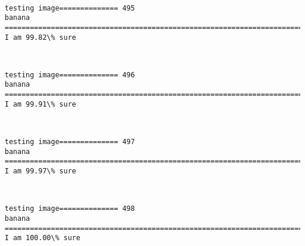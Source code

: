 \documentclass[11pt]{article}
\begin{document}
    \begin{center}
    \end{center}
    { \hspace*{\fill} \\}
    
    \begin{Verbatim}[commandchars=\\\{\}]
testing image============== 495
banana
============================================================================
I am 99.82\% sure

    \end{Verbatim}

    \begin{center}
    \end{center}
    { \hspace*{\fill} \\}
    
    \begin{Verbatim}[commandchars=\\\{\}]
testing image============== 496
banana
============================================================================
I am 99.91\% sure

    \end{Verbatim}

    \begin{center}
    \end{center}
    { \hspace*{\fill} \\}
    
    \begin{Verbatim}[commandchars=\\\{\}]
testing image============== 497
banana
============================================================================
I am 99.97\% sure

    \end{Verbatim}

    \begin{center}
    \end{center}
    { \hspace*{\fill} \\}
    
    \begin{Verbatim}[commandchars=\\\{\}]
testing image============== 498
banana
============================================================================
I am 100.00\% sure

    \end{Verbatim}
\end{document}
